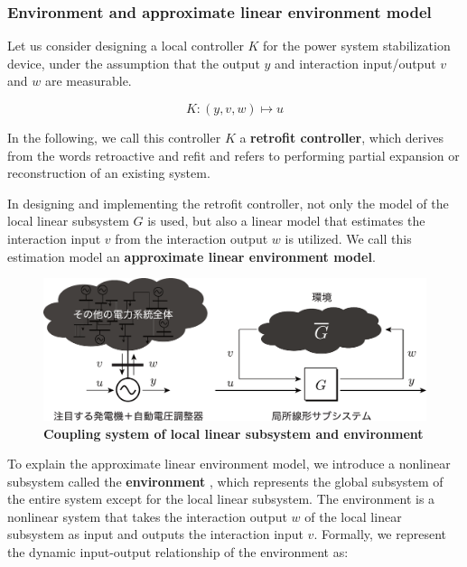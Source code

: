 \documentclass[graybox, envcountchap]{svmult}
\begin{document}
\smallskip
\subsubsection{Environment and approximate linear environment model}

Let us consider designing a local controller $K$ for the power system stabilization
device, under the assumption that the output $y$ and interaction input/output
$v$ and $w$ are measurable.

\[
  K : (y,v,w)\mapsto u
\]

In the following, we call this controller $K$ a \textbf{retrofit
controller}, which derives from the words retroactive
and refit and refers to performing partial expansion or reconstruction of an
existing system.

In designing and implementing the retrofit controller, not only the model of the
local linear subsystem $G$ is used, but also a linear model that estimates the
interaction input $v$ from the interaction output $w$ is utilized. We call this
estimation model an \textbf{approximate linear environment
model}.

\begin{figure}[t]
  \centering
  \includegraphics[width = .99\linewidth]{figs/retconsys2}
  \medskip
  \caption{\textbf{Coupling system of local linear subsystem and environment}}
  \label{fig:retconsys}
  \medskip
\end{figure}

To explain the approximate linear environment model, we introduce a nonlinear
subsystem called the \textbf{environment} , which represents
the global subsystem of the entire system except for the local linear subsystem.
The environment is a nonlinear system that takes the interaction output $w$ of
the local linear subsystem as input and outputs the interaction input $v$.
Formally, we represent the dynamic input-output relationship of the environment
as:
\end{document}
